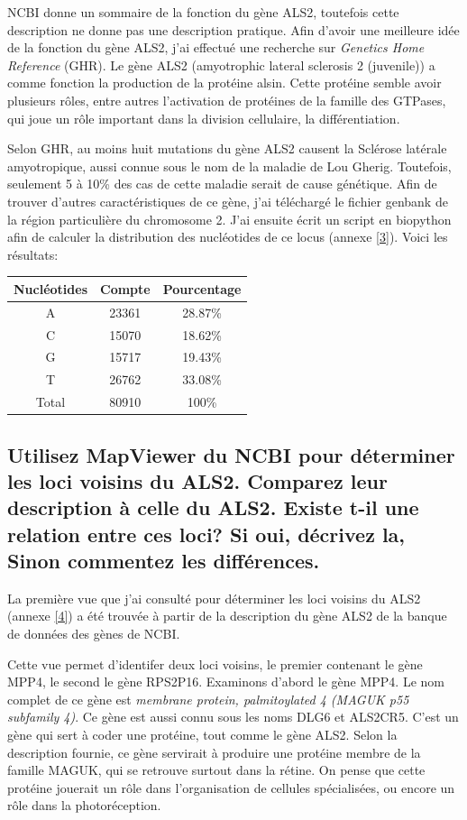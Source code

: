 \documentclass[11pt]{article} %
\begin{document}
NCBI donne un sommaire de la fonction du gène ALS2, toutefois cette description ne donne pas une description pratique.
Afin d'avoir une meilleure idée de la fonction du gène ALS2, j'ai effectué une recherche sur \emph{Genetics Home Reference} (GHR).
Le gène ALS2 (amyotrophic lateral sclerosis 2 (juvenile)) a comme fonction la production de la protéine alsin. Cette protéine
semble avoir plusieurs rôles, entre autres l'activation de protéines de la famille des GTPases, qui joue un rôle important dans
la division cellulaire, la différentiation.

Selon GHR, au moins huit mutations du gène ALS2 causent la Sclérose latérale amyotropique, aussi connue sous le nom de la
maladie de Lou Gherig. Toutefois, seulement 5 à 10\% des cas de cette maladie serait de cause génétique. Afin de trouver
d'autres caractéristiques de ce gène, j'ai téléchargé le fichier genbank de la région particulière du chromosome 2.
J'ai ensuite écrit un script en biopython afin de calculer la distribution des nucléotides de ce locus (annexe \ref{3}). Voici les résultats:
\begin{center}
\begin{tabular}{|c|c|c|}
 \hline
 Nucléotides & Compte & Pourcentage \\
 \hline
 A & 23361 & 28.87\% \\
 \hline
  C & 15070 & 18.62\% \\
 \hline
  G & 15717 & 19.43\% \\
 \hline
  T & 26762 & 33.08\% \\
 \hline
  Total & 80910 & 100\% \\
 \hline
\end{tabular}
\end{center}

\subsection[Loci voisins du gène ALS2]{Utilisez MapViewer du NCBI pour déterminer les loci voisins du ALS2. Comparez leur 
description à celle du ALS2. Existe t-il une relation entre ces loci? Si oui, décrivez la, Sinon commentez les différences.}

La première vue que j'ai consulté pour déterminer les loci voisins du ALS2 (annexe \ref{4}) a été trouvée à partir de la
description du gène ALS2 de la banque de données des gènes de NCBI.

Cette vue permet d'identifer deux loci voisins, le premier contenant le gène MPP4, le second le gène RPS2P16. Examinons
d'abord le gène MPP4. Le nom complet de ce gène est \emph{membrane protein, palmitoylated 4 (MAGUK p55 subfamily 4)}. Ce gène est aussi connu sous les noms DLG6 et ALS2CR5. C'est
un gène qui sert à coder une protéine, tout comme le gène ALS2. Selon la description fournie, ce gène servirait à produire une
protéine membre de la famille MAGUK, qui se retrouve surtout dans la rétine. On pense que cette protéine jouerait un rôle
dans l'organisation de cellules spécialisées, ou encore un rôle dans la photoréception. 
\end{document}
